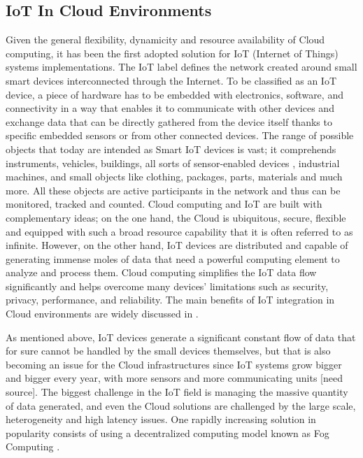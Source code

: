 \subsection{IoT In Cloud Environments}
Given the general flexibility, dynamicity and resource availability of Cloud computing, it has been the first adopted solution for IoT (Internet of Things) systems implementations.
The IoT label defines the network created around small smart devices interconnected through the Internet. To be classified as an IoT device, a piece of hardware has to be embedded with electronics, software, and connectivity in a way that enables it to communicate with other devices and exchange data that can be directly gathered from the device itself thanks to specific embedded sensors or from other connected devices.
The range of possible objects that today are intended as Smart IoT devices is vast; it comprehends instruments, vehicles, buildings, all sorts of sensor-enabled devices \cite{gokhale2018introduction}, industrial machines, and small objects like clothing, packages, parts, materials and much more. All these objects are active participants in the network and thus can be monitored, tracked and counted.
Cloud computing and IoT are built with complementary ideas; on the one hand, the Cloud is ubiquitous, secure, flexible and equipped with such a broad resource capability that it is often referred to as infinite. However, on the other hand, IoT devices are distributed and capable of generating immense moles of data that need a powerful computing element to analyze and process them.
Cloud computing simplifies the IoT data flow significantly and helps overcome many devices' limitations such as security, privacy, performance, and reliability. The main benefits of IoT integration in Cloud environments are widely discussed in \cite{atlam2017integration}.

As mentioned above, IoT devices generate a significant constant flow of data that for sure cannot be handled by the small devices themselves, but that is also becoming an issue for the Cloud infrastructures since IoT systems grow bigger and bigger every year, with more sensors and more communicating units [need source].
The biggest challenge in the IoT field is managing the massive quantity of data generated, and even the Cloud solutions are challenged by the large scale, heterogeneity and high latency issues. One rapidly increasing solution in popularity consists of using a decentralized computing model known as Fog Computing \cite{iorga2018fog}.

